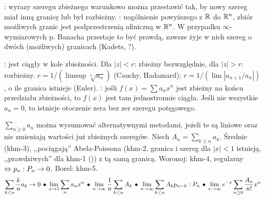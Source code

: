:  wyrazy szeregu zbieżnego warunkowo można przestawić tak, by nowy szereg miał inną granicę lub był rozbieżny.
: uogólnienie powyższego z $\mathbb{R}$ do $\mathbb{R}^n$, zbiór możliwych granic jest podprzestrzenią afiniczną w $\mathbb{R}^n$.
W przypadku $\infty$-wymiarowych p. Banacha przestaje to być prawdą, zawsze żyje w nich szereg o dwóch (możliwych) granicach (Kadets, ?).

:  jest ciągły w kole zbieżności.
Dla $|z| < r$: zbieżny bezwzględnie, dla $|z| > r$: rozbieżny.
$r = 1/\left(\limsup \sqrt[n]{a_n}\right)$ (Cauchy, Hadamard); $r = 1/\left(\lim \left| {a_{n+1}}/{a_n}\right|\right)$, o ile granica istnieje (Euler).
: jeśli $f(x) = \sum a_nx^n$ jest zbieżny na końcu przedziału zbieżności, to $f(x)$ jest tam jednostronnie ciągła.
Jeśli nie wszystkie $a_n = 0$, to istnieje otoczenie zera bez zer szeregu potęgowego.

 $\sum_{n \ge 0} a_n$ można wysumować alternatywnymi metodami, jeżeli te są liniowe oraz nie zmieniają wartości już zbieżnych szeregów. %
Niech $A_n = \sum_{k \le n} a_k$.
Średnie (khm-3), ,,pociągają'' Abela-Poissona (khm-2, granica i szereg dla $|x| < 1$ istnieją, ,,prawdziwych'' dla khm-1 ()) z tą samą granicą.
Woronoj: khm-4, regularny $\Leftrightarrow p_n : P_n \to 0$.
Borel: khm-5.
\[
	\sum_{k \le n} \frac k n a_k \to 0 \spk
	\lim_{x \to 1} \sum_n a_n x^n \spk
	\lim_{n \to \infty} \frac 1 n \sum_{k \le n} A_k \spk
	\lim_{n \to \infty} \sum_{k \le n} A_k p_{n - k} : P_n \spk %
	\lim_{x \to \infty} e^{-x} \sum_{n \ge 0} \frac{A_n}{n!} x^n %
\]